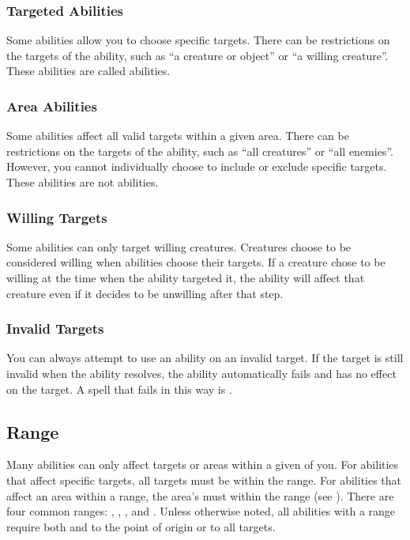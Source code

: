        \subsubsection{Targeted Abilities}\label{Targeted Abilities}
            Some abilities allow you to choose specific targets.
            There can be restrictions on the targets of the ability, such as ``a creature or object'' or ``a willing creature''.
            These abilities are called  abilities.

        \subsubsection{Area Abilities}
            Some abilities affect all valid targets within a given area.
            There can be restrictions on the targets of the ability, such as ``all creatures'' or ``all enemies''.
            However, you cannot individually choose to include or exclude specific targets.
            These abilities are not  abilities.

        \subsubsection{Willing Targets}
            Some abilities can only target willing creatures.
            Creatures choose to be considered willing when abilities choose their targets.
            If a creature chose to be willing at the time when the ability targeted it, the ability will affect that creature even if it decides to be unwilling after that step.

        \subsubsection{Invalid Targets}
            You can always attempt to use an ability on an invalid target.
            If the target is still invalid when the ability resolves, the ability automatically fails and has no effect on the target.
            A spell that fails in this way is .

    \subsection{Range}\label{Range}
        Many abilities can only affect targets or areas within a given  of you.
        For abilities that affect specific targets, all targets must be within the range.
        For abilities that affect an area within a range, the area's  must within the range (see ).
        There are four common ranges: \rngclose, \rngmed, \rnglong, and \rngext.
        Unless otherwise noted, all abilities with a range require both  and  to the point of origin or to all targets.

